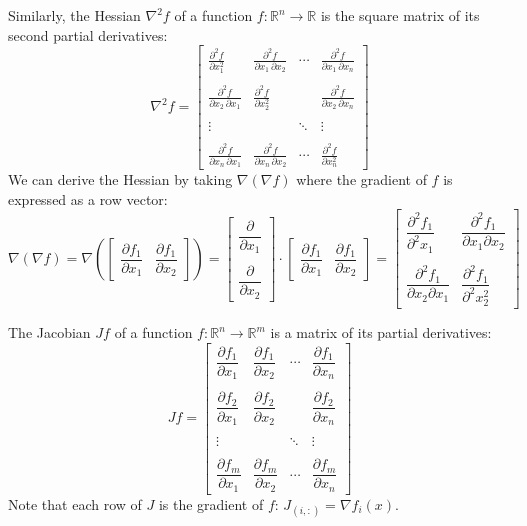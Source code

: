 \documentclass{article}
\begin{document}
Similarly, the Hessian $\nabla ^2 f$ of a function $ f: \mathbb{R}^n \longrightarrow \mathbb{R} $
is the square matrix of its second partial derivatives:
\[
    \nabla ^2 f =
    \begin{bmatrix}
        \frac{\partial^2 f}{\partial x_1^2} & \frac{\partial^2 f}{\partial x_1\,\partial x_2} & \cdots & \frac{\partial^2 f}{\partial x_1\,\partial x_n} \\ \\
        \frac{\partial^2 f}{\partial x_2\,\partial x_1} & \frac{\partial^2 f}{\partial x_2^2} &  & \frac{\partial^2 f}{\partial x_2\,\partial x_n} \\ \\
        \vdots &   & \ddots & \vdots \\ \\
        \frac{\partial^2 f}{\partial x_n\,\partial x_1} & \frac{\partial^2 f}{\partial x_n\,\partial x_2} & \cdots & \frac{\partial^2 f}{\partial x_n^2}
    \end{bmatrix}
\]
We can derive the Hessian by taking $\nabla(\nabla f)$ where the gradient of $f$ is expressed as a row vector:
\[
    \nabla(\nabla f) = \nabla (
    \begin{bmatrix}
        \dfrac{\partial f_1}{\partial x_1} & \dfrac{\partial f_1}{\partial x_2}
    \end{bmatrix}) =
    \begin{bmatrix}
        \dfrac{\partial }{\partial x_1} \\ \\
        \dfrac{\partial }{\partial x_2}
    \end{bmatrix} \cdot
    \begin{bmatrix}
        \dfrac{\partial f_1}{\partial x_1} & \dfrac{\partial f_1}{\partial x_2}
    \end{bmatrix} =
    \begin{bmatrix}
        \dfrac{\partial^2 f_1}{\partial^2 x_1} & \dfrac{\partial^2 f_1}{\partial x_1 \partial x_2} \\ \\
        \dfrac{\partial^2 f_1}{\partial x_2 \partial x_1} & \dfrac{\partial^2 f_1}{\partial^2 x_2^2}
    \end{bmatrix}
\]


The Jacobian $J f$ of a function $ f: \mathbb{R}^n \longrightarrow \mathbb{R}^m $
is a matrix of its partial derivatives:
\[
    Jf=
    \begin{bmatrix}
        \dfrac{\partial f_1}{\partial x_1} & \dfrac{\partial f_1}{\partial x_2} & \cdots & \dfrac{\partial f_1}{\partial x_n} \\ \\
        \dfrac{\partial f_2}{\partial x_1} & \dfrac{\partial f_2}{\partial x_2} &   & \dfrac{\partial f_2}{\partial x_n} \\ \\
        \vdots &  & \ddots & \vdots \\ \\
        \dfrac{\partial f_m}{\partial x_1} & \dfrac{\partial f_m}{\partial x_2} & \cdots & \dfrac{\partial f_m}{\partial x_n}
    \end{bmatrix}
\]
Note that each row of $J$ is the gradient of $f$: $J_{(i, :)} = \nabla f_i(x)$.
\end{document}
